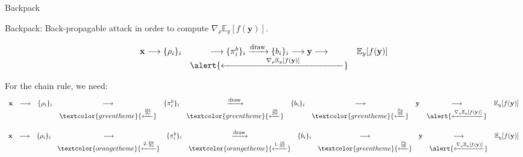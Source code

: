 \documentclass[10pt,aspectratio=169]{beamer}
\begin{document}
\begin{frame}{Backpack}

    \alert{Backpack}: \alert{Back-p}ropagable att\alert{ack} \pause in order to compute \alert{$\nabla_\rho \mathbb{E}_{y} [f(\mathbf{y})]$}.

    \begin{equation*}
        \begin{array}{ccccccccccc}
            \mathbf{x} \longrightarrow \{\rho_i\}_i & \longrightarrow  \{\pi_i^b\}_i    \xrightarrow{\mbox{\footnotesize{draw}}}  \{b_i\}_i   \longrightarrow  \mathbf{y}  \longrightarrow  & \mathbb{E}_{y} [f(\mathbf{y})] \\ 
            & \alert{\xleftarrow{\hspace{5em} \nabla_\rho \mathbb{E}_{y} [f(\mathbf{y})]\hspace{5em}}} 
        \end{array}
    \end{equation*}
    
    \pause
    For the chain rule, we need:
    \begin{equation*}
        \begin{array}{ccccccccccc}
            \mathbf{x} & \longrightarrow & \{\rho_i\}_i & \longrightarrow & \{\pi_i^b\}_i & \xrightarrow{\mbox{\footnotesize{draw}}} &  \{b_i\}_i  & \longrightarrow  & \mathbf{y} & \longrightarrow  & \mathbb{E}_{y} [f(\mathbf{y})] \\ 
            &&& \textcolor{greentheme}{\xleftarrow{\frac{\partial \pi}{\partial \rho} }}
            && \textcolor{greentheme}{\xleftarrow{\frac{\partial b}{\partial \pi} }}
            && \textcolor{greentheme}{\xleftarrow{\frac{\partial y}{\partial b}}}
            && \alert{\xleftarrow{\nabla_y \mathbb{E}_{y} [f(\mathbf{y})]}} 
            

        \end{array}
    \end{equation*}

    \pause
    \begin{equation*}
        \begin{array}{ccccccccccc}
            \mathbf{x} & \longrightarrow & \{\rho_i\}_i & \longrightarrow & \{\pi_i^b\}_i & \xrightarrow{\mbox{\footnotesize{draw}}} &  \{b_i\}_i  & \longrightarrow  & \mathbf{y} & \longrightarrow  & \mathbb{E}_{y} [f(\mathbf{y})] \\ 
            &&& \textcolor{orangetheme}{\xleftarrow{2. \frac{\partial \pi}{\partial \rho} }}
            && \textcolor{orangetheme}{\xleftarrow{1. \frac{\partial b}{\partial \pi} }}
            && \textcolor{greentheme}{\xleftarrow{\frac{\partial y}{\partial b}}}
            && \alert{\xleftarrow{\nabla_y \mathbb{E}_{y} [f(\mathbf{y})]}} 
        \end{array}
    \end{equation*}
    

\end{frame}
\end{document}
